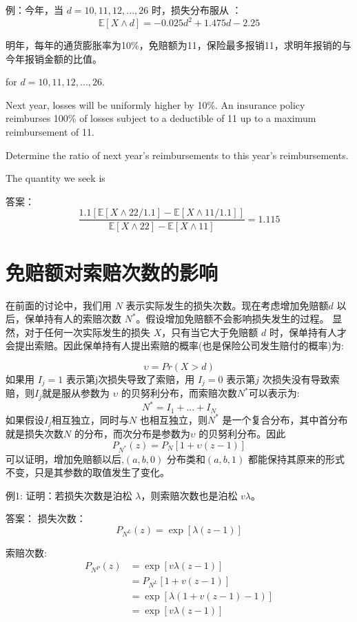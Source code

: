 \documentclass[
]{book}
\begin{document}
例：今年，当 \(d = 10,11,12,.. .,26\) 时，损失分布服从 ：
\[
\mathbb{E}[X\wedge d]=-0.025d^2+1.475d-2.25
\]

明年，每年的通货膨胀率为10\%，免赔额为11，保险最多报销11，求明年报销的与今年报销金额的比值。

for \(d = 10,11,12,.. .,26\).

Next year, losses will be uniformly higher by 10\%. An
insurance policy reimburses 100\% of losses subject to a deductible of 11 up to a maximum
reimbursement of 11.

Determine the ratio of next year's reimbursements to this year's
reimbursements.

The quantity we seek is

答案：
\[
\frac{1.1[\mathbb{E}[X\wedge 22/1.1]-\mathbb{E}[X\wedge 11/1.1]]}{\mathbb{E}[X\wedge 22]-\mathbb{E}[X\wedge 11]}
=1.115
\]

\hypertarget{ux514dux8d54ux989dux5bf9ux7d22ux8d54ux6b21ux6570ux7684ux5f71ux54cd}{%
\section{免赔额对索赔次数的影响}\label{ux514dux8d54ux989dux5bf9ux7d22ux8d54ux6b21ux6570ux7684ux5f71ux54cd}}

在前面的讨论中，我们用 \(N\) 表示实际发生的损失次数。现在考虑增加免赔额\(d\) 以后，保单持有人的索赔次数 \(N^*\)。假设增加免赔额不会影响损失发生的过程。
显然，对于任何一次实际发生的损失 \(X\)，只有当它大于免赔额 \(d\) 时，保单持有人才会提出索赔。因此保单持有人提出索赔的概率(也是保险公司发生赔付的概率)为:

\[\upsilon=Pr(X>d)\]
如果用 \(I_j = 1\) 表示第j次损失导致了索赔，用 \(I_j=0\) 表示第\(j\) 次损失没有导致索赔，则\(I_j\)就是服从参数为 \(\upsilon\) 的贝努利分布，而索赔次数\(N^*\)可以表示为:
\[N^*=I_1+...+I_N\]
如果假设\(I_j\)相互独立，同时与\(N\) 也相互独立，则\(N^*\) 是一个复合分布，其中首分布就是损失次数\(N\) 的分布，而次分布是参数为\(\upsilon\) 的贝努利分布。因此
\[P_{N^*}(z)=P_N[1+\upsilon (z-1)]\]
可以证明，增加免赔额以后,\((a,b,0)\) 分布类和\((a,b,1)\) 都能保持其原来的形式不变，只是其参数的取值发生了变化。

例1:
证明：若损失次数是泊松 \(\lambda\)，则索赔次数也是泊松 \(v\lambda\)。

答案：
损失次数：
\[
P_{N^L}(z)=\exp[{\lambda}{(z-1)}]
\]

索赔次数:
\[
\begin{align*}
P_{N^P}(z)&=\exp[{v\lambda}(z-1)]\\
&=P_{N^L}[1+v(z-1)]\\
&=\exp[\lambda(1+ v(z-1)-1)]\\
&=\exp[{v\lambda}{(z-1)}]
\end{align*}
\]
\end{document}
